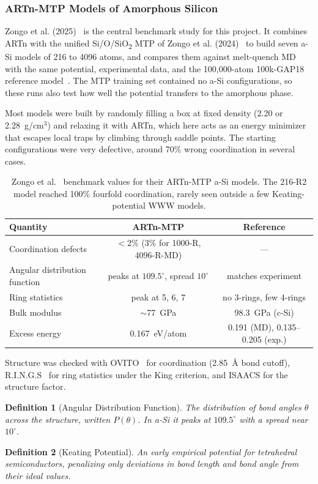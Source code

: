 \documentclass{article}
\newtheorem{definition}{Definition}
\begin{document}
\subsubsection{ARTn-MTP Models of Amorphous Silicon}
Zongo et al. (2025)~\cite{zongo2025} is the central benchmark study for this project. It combines ARTn with the unified Si/O/SiO\textsubscript{2} MTP of Zongo et al. (2024)~\cite{zongo2024} to build seven a-Si models of 216 to 4096 atoms, and compares them against melt-quench MD with the same potential, experimental data, and the 100{,}000-atom 100k-GAP18 reference model~\cite{deringer2018}. The MTP training set contained no a-Si configurations, so these runs also test how well the potential transfers to the amorphous phase.

Most models were built by randomly filling a box at fixed density (2.20 or 2.28~g/cm$^3$) and relaxing it with ARTn, which here acts as an energy minimizer that escapes local traps by climbing through saddle points. The starting configurations were very defective, around 70\% wrong coordination in several cases.

\begin{table}[H]
\centering
\small
\begin{tabular}{l|c|c}
\toprule
Quantity & ARTn-MTP & Reference \\
\midrule
Coordination defects & $<2\%$ (3\% for 1000-R, 4096-R-MD) & --- \\
Angular distribution function & peaks at $109.5^\circ$, spread $10^\circ$ & matches experiment \\
Ring statistics & peak at 5, 6, 7 & no 3-rings, few 4-rings \\
Bulk modulus & $\sim$77~GPa & 98.3~GPa (c-Si) \\
Excess energy & 0.167~eV/atom & 0.191 (MD), 0.135--0.205 (exp.) \\
\bottomrule
\end{tabular}
\caption{Zongo et al.~\cite{zongo2025} benchmark values for their ARTn-MTP a-Si models. The 216-R2 model reached 100\% fourfold coordination, rarely seen outside a few Keating-potential WWW models.}
\label{tab:zongo_benchmark}
\end{table}

Structure was checked with OVITO~\cite{ovito} for coordination (2.85~\AA{} bond cutoff), R.I.N.G.S~\cite{rings} for ring statistics under the King criterion, and ISAACS for the structure factor.
\begin{definition}[Angular Distribution Function]
    The distribution of bond angles $\theta$ across the structure, written $P(\theta)$. In a-Si it peaks at $109.5^\circ$ with a spread near $10^\circ$.
\end{definition}
\begin{definition}[Keating Potential]
    An early empirical potential for tetrahedral semiconductors, penalizing only deviations in bond length and bond angle from their ideal values.
\end{definition}
\end{document}
